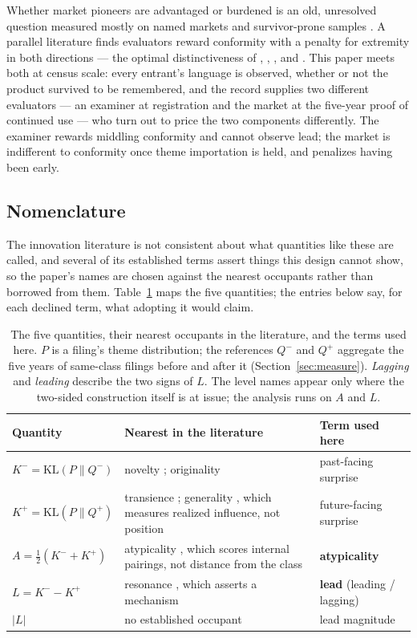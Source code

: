 Whether market pioneers are advantaged or burdened is an old, unresolved
question measured mostly on named markets and survivor-prone samples
\citep{GolderTellis1993, SemadeniAnderson2010}. A parallel literature
finds evaluators reward conformity with a penalty for extremity in both
directions --- the optimal distinctiveness of \citet{Zuckerman1999},
\citet{Hsu2006}, \citet{Zhao2017}, and \citet{TaeuscherRothe2020}. This
paper meets both at census scale: every entrant's language is observed,
whether or not the product survived to be remembered, and the record
supplies two different evaluators --- an examiner at registration and the
market at the five-year proof of continued use --- who turn out to price
the two components differently. The examiner rewards middling conformity
and cannot observe lead; the market is indifferent to conformity once
theme importation is held, and penalizes having been early.

\subsection{Nomenclature}\label{sec:nomenclature}

The innovation literature is not consistent about what quantities like
these are called, and several of its established terms assert things this
design cannot show, so the paper's names are chosen against the nearest
occupants rather than borrowed from them. Table~\ref{tab:nomenclature}
maps the five quantities; the entries below say, for each declined term,
what adopting it would claim.

\begin{table}[h]\centering\small
\caption{The five quantities, their nearest occupants in the literature,
and the terms used here. $P$ is a filing's theme distribution;
the references $Q^{-}$ and $Q^{+}$ aggregate the five years of
same-class filings before and after it (Section~\ref{sec:measure}).
\emph{Lagging} and \emph{leading} describe the two signs of $L$. The
level names appear only where the two-sided construction itself is at
issue; the analysis runs on $A$ and $L$.}
\label{tab:nomenclature}
\begin{tabular}{p{3.4cm}p{5.6cm}p{4.4cm}}
\toprule
Quantity & Nearest in the literature & Term used here \\
\midrule
$K^{-} = \mathrm{KL}(P \| Q^{-})$ & novelty \citep{Murdock2017, Barron2018}; originality \citep{HallJaffe2001} & past-facing surprise \\
$K^{+} = \mathrm{KL}(P \| Q^{+})$ & transience \citep{Murdock2017}; generality \citep{HallJaffe2001}, which measures realized influence, not position & future-facing surprise \\
$A = \tfrac{1}{2}(K^{-} + K^{+})$ & atypicality \citep{Uzzi2013}, which scores internal pairings, not distance from the class & \textbf{atypicality} \\
$L = K^{-} - K^{+}$ & resonance \citep{Barron2018}, which asserts a mechanism & \textbf{lead} (leading / lagging) \\
$|L|$ & no established occupant & lead magnitude \\
\bottomrule
\end{tabular}
\end{table}

